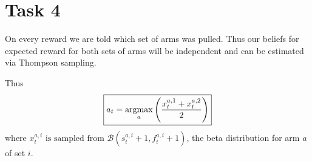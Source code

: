 \section*{Task 4}

On every reward we are told which set of arms was pulled. Thus our beliefs for expected reward for both sets of arms will be independent and can be estimated via Thompson sampling.


Thus
\begin{align*}
    \boxed{a_t = \operatorname*{argmax}_a \left(\dfrac{x_t^{a,1} + x_t^{a,2}}{2}\right)}
\end{align*}
where $\boxed{x_t^{a,i}\text{ is sampled from }\mathcal{B}(s_t^{a,i} + 1, f_t^{a,i} + 1)}$, the beta distribution for arm $a$ of set $i$.
